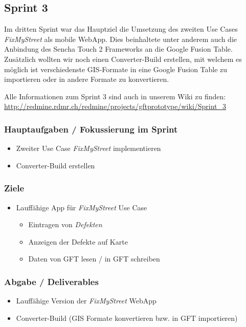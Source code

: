 \subsection{Sprint 3}

Im dritten Sprint war das Hauptziel die Umsetzung des zweiten Use Cases \emph{FixMyStreet} als mobile \gls{WebApp}. Dies beinhaltete unter anderem auch die Anbindung des Sencha Touch 2 Frameworks an die Google Fusion Table.
Zusätzlich wollten wir noch einen Converter-Build erstellen, mit welchem es möglich ist verschiedenste \gls{GIS}-Formate in eine Google Fusion Table zu importieren oder in andere Formate zu konvertieren.

Alle Informationen zum Sprint 3 sind auch in unserem Wiki zu finden:
\url{http://redmine.rdmr.ch/redmine/projects/gftprototype/wiki/Sprint_3}

\subsubsection{Hauptaufgaben / Fokussierung im Sprint}
\begin{itemize}
	\item Zweiter Use Case \emph{FixMyStreet} implementieren
	\item Converter-Build erstellen
\end{itemize}

\subsubsection{Ziele}
\begin{itemize}
	\item Lauffähige App für \emph{FixMyStreet} Use Case
	\begin{itemize}
		\item Eintragen von \emph{Defekten}
		\item Anzeigen der Defekte auf Karte
		\item Daten von GFT lesen / in GFT schreiben
	\end{itemize}
\end{itemize}

\subsubsection{Abgabe / Deliverables}
\begin{itemize}
	\item Lauffähige Version der \emph{FixMyStreet} \gls{WebApp}
	\item Converter-Build (\gls{GIS} Formate konvertieren bzw. in GFT importieren)
\end{itemize}

